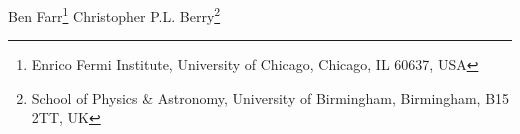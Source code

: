 Ben Farr\footnote{Enrico Fermi Institute, University of Chicago, Chicago, IL 60637, USA}
Christopher P.L. Berry\footnote{School of Physics & Astronomy, University of Birmingham, Birmingham, B15 2TT, UK}
    
    